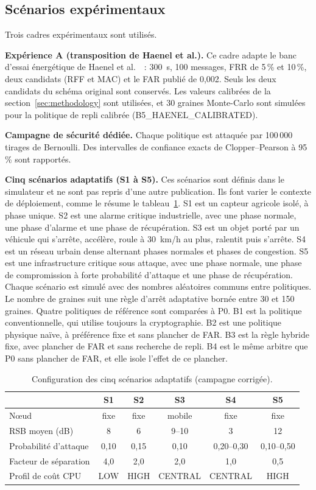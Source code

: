 \documentclass[conference]{IEEEtran}
\begin{document}
\subsection{Scénarios expérimentaux}
\label{sec:scenarios}

Trois cadres expérimentaux sont utilisés.

\textbf{Expérience A (transposition de Haenel et al.).} Ce cadre adapte le banc d'essai énergétique de Haenel et al.~\cite{haenel2021practical}~: 300~s, 100 messages, FRR de 5\,\% et 10\,\%, deux candidats (RFF et MAC) et le FAR publié de 0,002. Seuls les deux candidats du schéma original sont conservés. Les valeurs calibrées de la section~\ref{sec:methodology} sont utilisées, et 30 graines Monte-Carlo sont simulées pour la politique de repli calibrée (B5\_HAENEL\_CALIBRATED).

\textbf{Campagne de sécurité dédiée.} Chaque politique est attaquée par 100\,000 tirages de Bernoulli. Des intervalles de confiance exacts de Clopper--Pearson à 95\,\% sont rapportés.

\textbf{Cinq scénarios adaptatifs (S1 à S5).} Ces scénarios sont définis dans le simulateur et ne sont pas repris d'une autre publication. Ils font varier le contexte de déploiement, comme le résume le tableau~\ref{tab:scenarios}. S1 est un capteur agricole isolé, à phase unique. S2 est une alarme critique industrielle, avec une phase normale, une phase d'alarme et une phase de récupération. S3 est un objet porté par un véhicule qui s'arrête, accélère, roule à 30~km/h au plus, ralentit puis s'arrête. S4 est un réseau urbain dense alternant phases normales et phases de congestion. S5 est une infrastructure critique sous attaque, avec une phase normale, une phase de compromission à forte probabilité d'attaque et une phase de récupération. Chaque scénario est simulé avec des nombres aléatoires communs entre politiques. Le nombre de graines suit une règle d'arrêt adaptative bornée entre 30 et 150 graines. Quatre politiques de référence sont comparées à P0. B1 est la politique conventionnelle, qui utilise toujours la cryptographie. B2 est une politique physique naïve, à préférence fixe et sans plancher de FAR. B3 est la règle hybride fixe, avec plancher de FAR et sans recherche de repli. B4 est le même arbitre que P0 sans plancher de FAR, et elle isole l'effet de ce plancher.

\begin{table}[t]
\centering
\caption{Configuration des cinq scénarios adaptatifs (campagne corrigée).}
\label{tab:scenarios}
\begin{tabular}{lccccc}
\toprule
 & S1 & S2 & S3 & S4 & S5 \\
\midrule
N\oe{}ud & fixe & fixe & mobile & fixe & fixe \\
RSB moyen (dB) & 8 & 6 & 9--10 & 3 & 12 \\
Probabilité d'attaque & 0,10 & 0,15 & 0,10 & 0,20--0,30 & 0,10--0,50 \\
Facteur de séparation & 4,0 & 2,0 & 2,0 & 1,0 & 0,5 \\
Profil de coût CPU & LOW & HIGH & CENTRAL & CENTRAL & HIGH \\
\bottomrule
\end{tabular}
\end{table}
\end{document}

